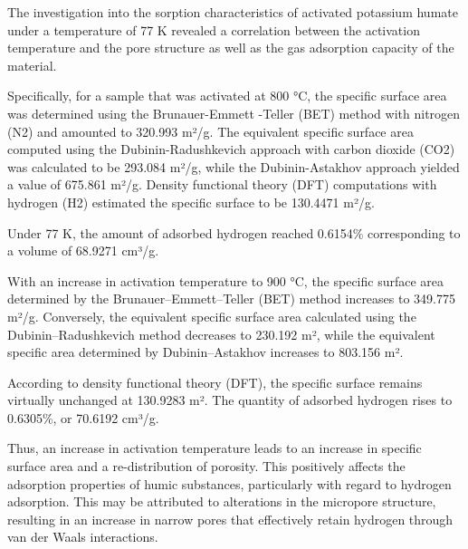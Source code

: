 
The investigation into the sorption characteristics of activated
potassium humate under a temperature of 77 K revealed a correlation
between the activation temperature and the pore structure as well as the
gas adsorption capacity of the material.

Specifically, for a sample that was activated at 800 °C, the specific
surface area was determined using the Brunauer-Emmett -Teller (BET)
method with nitrogen (N2) and amounted to 320.993 m²/g. The equivalent
specific surface area computed using the Dubinin-Radushkevich approach
with carbon dioxide (CO2) was calculated to be 293.084 m²/g, while the
Dubinin-Astakhov approach yielded a value of 675.861 m²/g. Density
functional theory (DFT) computations with hydrogen (H2) estimated the
specific surface to be 130.4471 m²/g.

Under 77 K, the amount of adsorbed hydrogen reached 0.6154\%
corresponding to a volume of 68.9271 cm³/g.

With an increase in activation temperature to 900 °C, the specific
surface area determined by the Brunauer--Emmett--Teller (BET) method
increases to 349.775 m²/g. Conversely, the equivalent specific surface
area calculated using the Dubinin--Radushkevich method decreases to
230.192 m², while the equivalent specific area determined by
Dubinin--Astakhov increases to 803.156 m².

According to density functional theory (DFT), the specific surface
remains virtually unchanged at 130.9283 m². The quantity of adsorbed
hydrogen rises to 0.6305\%, or 70.6192 cm³/g.

Thus, an increase in activation temperature leads to an increase in
specific surface area and a re-distribution of porosity. This positively
affects the adsorption properties of humic substances, particularly with
regard to hydrogen adsorption. This may be attributed to alterations in
the micropore structure, resulting in an increase in narrow pores that
effectively retain hydrogen through van der Waals interactions.

